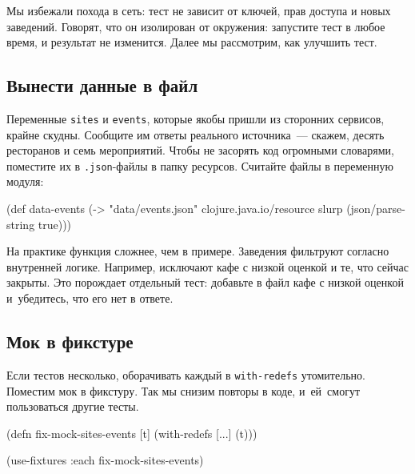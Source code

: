 \fi

\fi

Мы избежали похода в сеть: тест не зависит от ключей, прав доступа и новых
заведений. Говорят, что он изолирован от окружения: запустите тест в любое
время, и результат не изменится. Далее мы рассмотрим, как улучшить тест.

\subsection{Вынести данные в файл}

Переменные \verb|sites| и \verb|events|, которые якобы пришли из сторонних
сервисов, крайне скудны. Сообщите им ответы реального источника~--- скажем,
десять ресторанов и семь мероприятий. Чтобы не засорять код огромными словарями,
поместите их в \verb|.json|-файлы в папку ресурсов. Считайте файлы в переменную
модуля:


\begin{english}
  \begin{clojure}
(def data-events
  (-> "data/events.json"
      clojure.java.io/resource
      slurp
      (json/parse-string true)))
  \end{clojure}
\end{english}

На практике функция  сложнее, чем в
примере. Заведения фильтруют согласно внутренней логике. Например, исключают
кафе с низкой оценкой и те, что сейчас закрыты. Это порождает отдельный тест:
добавьте в файл кафе с низкой оценкой и~убедитесь, что его нет в ответе.

\subsection{Мок в фикстуре}


Если тестов несколько, оборачивать каждый в \verb|with-redefs|
утомительно. Поместим мок в фикстуру. Так мы снизим повторы в коде, и~ей~смогут
пользоваться другие тесты.

\ifnarrow

\begin{english}
  \begin{clojure}
(defn fix-mock-sites-events [t]
  (with-redefs [...]
    (t)))

(use-fixtures :each
  fix-mock-sites-events)
  \end{clojure}
\end{english}

